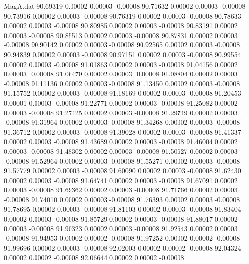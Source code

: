 \begin{filecontents}{MagA.dat}
  90.69319    0.00002    0.00003   -0.00008
  90.71632    0.00002    0.00003   -0.00008
  90.73916    0.00002    0.00003   -0.00008
  90.76319    0.00002    0.00003   -0.00008
  90.78633    0.00002    0.00003   -0.00008
  90.80985    0.00002    0.00003   -0.00008
  90.83191    0.00002    0.00003   -0.00008
  90.85513    0.00002    0.00003   -0.00008
  90.87831    0.00002    0.00003   -0.00008
  90.90142    0.00002    0.00003   -0.00008
  90.92565    0.00002    0.00003   -0.00008
  90.94839    0.00002    0.00003   -0.00008
  90.97151    0.00002    0.00003   -0.00008
  90.99554    0.00002    0.00003   -0.00008
  91.01863    0.00002    0.00003   -0.00008
  91.04156    0.00002    0.00003   -0.00008
  91.06479    0.00002    0.00003   -0.00008
  91.08804    0.00002    0.00003   -0.00008
  91.11136    0.00002    0.00003   -0.00008
  91.13450    0.00002    0.00003   -0.00008
  91.15752    0.00002    0.00003   -0.00008
  91.18169    0.00002    0.00003   -0.00008
  91.20453    0.00001    0.00003   -0.00008
  91.22771    0.00002    0.00003   -0.00008
  91.25082    0.00002    0.00003   -0.00008
  91.27425    0.00002    0.00003   -0.00008
  91.29749    0.00002    0.00003   -0.00008
  91.31964    0.00002    0.00003   -0.00008
  91.34268    0.00002    0.00003   -0.00008
  91.36712    0.00002    0.00003   -0.00008
  91.39028    0.00002    0.00003   -0.00008
  91.41337    0.00002    0.00003   -0.00008
  91.43689    0.00002    0.00003   -0.00008
  91.46004    0.00002    0.00003   -0.00008
  91.48302    0.00002    0.00003   -0.00008
  91.50627    0.00002    0.00003   -0.00008
  91.52964    0.00002    0.00003   -0.00008
  91.55271    0.00002    0.00003   -0.00008
  91.57779    0.00002    0.00003   -0.00008
  91.60090    0.00002    0.00003   -0.00008
  91.62430    0.00002    0.00003   -0.00008
  91.64741    0.00002    0.00003   -0.00008
  91.67091    0.00002    0.00003   -0.00008
  91.69362    0.00002    0.00003   -0.00008
  91.71766    0.00002    0.00003   -0.00008
  91.74010    0.00002    0.00003   -0.00008
  91.76393    0.00002    0.00003   -0.00008
  91.78695    0.00002    0.00003   -0.00008
  91.81103    0.00002    0.00003   -0.00008
  91.83404    0.00002    0.00003   -0.00008
  91.85729    0.00002    0.00003   -0.00008
  91.88017    0.00002    0.00003   -0.00008
  91.90323    0.00002    0.00003   -0.00008
  91.92643    0.00002    0.00003   -0.00008
  91.94953    0.00002    0.00002   -0.00008
  91.97252    0.00002    0.00002   -0.00008
  91.99696    0.00002    0.00003   -0.00008
  92.02003    0.00002    0.00002   -0.00008
  92.04324    0.00002    0.00002   -0.00008
  92.06644    0.00002    0.00002   -0.00008

\end{filecontents}

